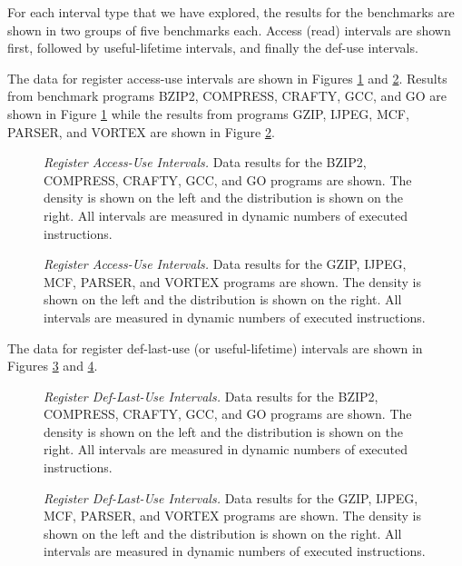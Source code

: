 For each interval type that we have explored, the results
for the benchmarks are shown in two groups of five benchmarks each.
Access (read) intervals are shown first, followed by useful-lifetime
intervals, and finally the def-use intervals.

%
The data for register access-use intervals are
shown in Figures \ref{fig:aa_rrint} 
and \ref{fig:ab_rrint}.
Results from benchmark programs BZIP2, COMPRESS, CRAFTY, GCC, and GO
are shown in Figure \ref{fig:aa_rrint} while the results
from programs GZIP, IJPEG, MCF, PARSER, and VORTEX are shown in
Figure \ref{fig:ab_rrint}.
%
\begin{figure}
\centering
{}
\caption{{\em Register Access-Use Intervals.} 
\small{Data results for the 
BZIP2, COMPRESS, CRAFTY, GCC, and GO programs are shown.
The density is shown on the left and the distribution is shown
on the right.
All intervals are measured in dynamic numbers of executed instructions.}
}
\label{fig:aa_rrint}
\end{figure}
%
\begin{figure}
\centering
{}
\caption{{\em Register Access-Use Intervals.} 
\small{Data results for the
GZIP, IJPEG, MCF, PARSER, and VORTEX programs are shown.
The density is shown on the left and the distribution is shown
on the right.
All intervals are measured in dynamic numbers of executed instructions.}
}
\label{fig:ab_rrint}
\end{figure}
%

%
The data for register def-last-use (or useful-lifetime) intervals are
shown in Figures \ref{fig:aa_rlife} 
and \ref{fig:ab_rlife}.
%
\begin{figure}
\centering
{}
\caption{{\em Register Def-Last-Use Intervals.} 
\small{
Data results for the 
BZIP2, COMPRESS, CRAFTY, GCC, and GO programs are shown.
The density is shown on the left and the distribution is shown
on the right.
All intervals are measured in dynamic numbers of executed instructions.}
}
\label{fig:aa_rlife}
\end{figure}
%
\begin{figure}
\centering
{}
\caption{{\em Register Def-Last-Use Intervals.} 
\small{
Data results for the
GZIP, IJPEG, MCF, PARSER, and VORTEX programs are shown.
The density is shown on the left and the distribution is shown
on the right.
All intervals are measured in dynamic numbers of executed instructions.}
}
\label{fig:ab_rlife}
\end{figure}
%

